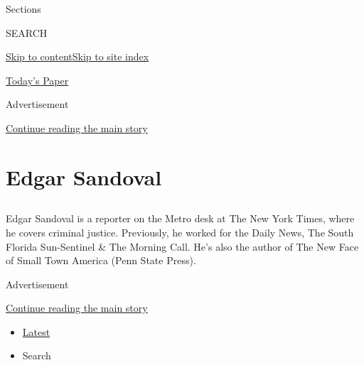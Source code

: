 Sections

SEARCH

\protect\hyperlink{site-content}{Skip to
content}\protect\hyperlink{site-index}{Skip to site index}

\href{https://myaccount.nytimes3xbfgragh.onion/auth/login?response_type=cookie\&client_id=vi}{}

\href{https://www.nytimes3xbfgragh.onion/section/todayspaper}{Today's
Paper}

Advertisement

\protect\hyperlink{after-top}{Continue reading the main story}

\hypertarget{edgar-sandoval}{%
\section{Edgar Sandoval}\label{edgar-sandoval}}

\subsection{}

Edgar Sandoval is a reporter on the Metro desk at The New York Times,
where he covers criminal justice. Previously, he worked for the Daily
News, The South Florida Sun-Sentinel \& The Morning Call. He's also the
author of The New Face of Small Town America (Penn State Press).

Advertisement

\protect\hyperlink{after-mid1}{Continue reading the main story}

\begin{itemize}
\tightlist
\item
  \protect\hyperlink{stream-panel}{Latest}
\item
  Search
\end{itemize}

